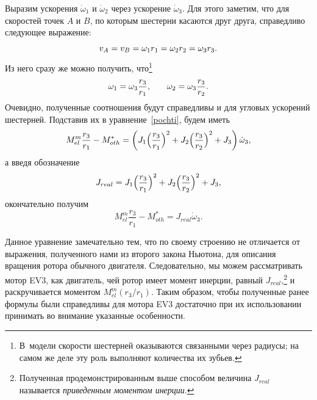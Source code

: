 \documentclass[12pt, a4paper, openany]{extarticle}
\begin{document}
Выразим ускорения $\dot\omega_1$ и $\dot\omega_2$ через ускорение $\dot\omega_3$.
Для этого заметим, что для скоростей точек $A$ и $B$, по которым шестерни касаются друг друга, справедливо следующее выражение:
\begin{equation}\label{VaVb}
	v_A = v_B = \omega_1r_1 = \omega_2r_2 = \omega_3r_3\ldotp
\end{equation}
Из него сразу же можно получить, что\footnote{В~модели скорости шестерней оказываются связанными через радиусы; на самом же деле эту роль выполняют количества их зубьев.}
\begin{align}\label{w&ws}
	&\omega_1 = \omega_3\frac{r_3}{r_1}, && &\omega_2 = \omega_3\frac{r_3}{r_2}\ldotp
\end{align}
Очевидно, полученные соотношения будут справедливы и для угловых ускорений шестерней.
Подставив их в уравнение~\eqref{pochti}, будем иметь
\begin{equation}
	M_{el}^m\frac{r_3}{r_1} - M_{oth}^* = \left(J_1\Bigl(\frac{r_3}{r_1}\Bigr)^2 + J_2\Bigl(\frac{r_3}{r_2}\Bigr)^2 +
	 J_3\right)\dot\omega_3,
\end{equation} 
а введя обозначение 
\begin{equation}\label{Jreal}
	J_{real} = J_1\Bigl(\frac{r_3}{r_1}\Bigr)^2 + J_2\Bigl(\frac{r_3}{r_2}\Bigr)^2 + J_3,
\end{equation} 
окончательно получим
\begin{equation}\label{final}
	M_{el}^m\frac{r_3}{r_1} - M_{oth}^* = J_{real}\dot\omega_3.
\end{equation} 

Данное уравнение замечательно тем, что по своему строению не отличается от выражения, полученного нами из второго закона Ньютона, для описания вращения ротора обычного двигателя.
Следовательно, мы можем рассматривать мотор EV3, как двигатель, чей ротор имеет момент инерции, равный $J_{real}$\lefteqn,\footnote{Полученная продемонстрированным выше способом величина $J_{real}$ называется \textit{приведенным моментом инерции}.} и раскручивается моментом $M_{el}^m(r_3/r_1)$.
Таким образом, чтобы полученные ранее формулы были справедливы для мотора EV3 достаточно при их использовании принимать во внимание указанные особенности.
\end{document}
